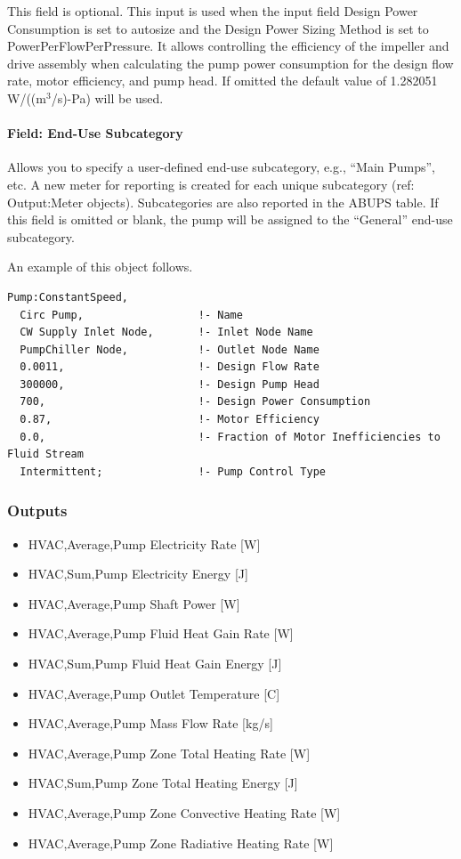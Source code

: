 This field is optional. This input is used when the input field Design Power Consumption is set to autosize and the Design Power Sizing Method is set to PowerPerFlowPerPressure. It allows controlling the efficiency of the impeller and drive assembly when calculating the pump power consumption for the design flow rate, motor efficiency, and pump head. If omitted the default value of 1.282051 W/((m\(^{3}\)/s)-Pa) will be used.

\paragraph{Field: End-Use Subcategory}\label{field-end-use-subcategory-2-000}

Allows you to specify a user-defined end-use subcategory, e.g., ``Main Pumps'', etc. A new meter for reporting is created for each unique subcategory (ref: Output:Meter objects). Subcategories are also reported in the ABUPS table. If this field is omitted or blank, the pump will be assigned to the ``General'' end-use subcategory.

An example of this object follows.

\begin{lstlisting}
Pump:ConstantSpeed,
  Circ Pump,                  !- Name
  CW Supply Inlet Node,       !- Inlet Node Name
  PumpChiller Node,           !- Outlet Node Name
  0.0011,                     !- Design Flow Rate
  300000,                     !- Design Pump Head
  700,                        !- Design Power Consumption
  0.87,                       !- Motor Efficiency
  0.0,                        !- Fraction of Motor Inefficiencies to Fluid Stream
  Intermittent;               !- Pump Control Type
\end{lstlisting}

\subsubsection{Outputs}\label{outputs-1-020}

\begin{itemize}
\item
  HVAC,Average,Pump Electricity Rate {[}W{]}
\item
  HVAC,Sum,Pump Electricity Energy {[}J{]}
\item
  HVAC,Average,Pump Shaft Power {[}W{]}
\item
  HVAC,Average,Pump Fluid Heat Gain Rate {[}W{]}
\item
  HVAC,Sum,Pump Fluid Heat Gain Energy {[}J{]}
\item
  HVAC,Average,Pump Outlet Temperature {[}C{]}
\item
  HVAC,Average,Pump Mass Flow Rate {[}kg/s{]}
\item
  HVAC,Average,Pump Zone Total Heating Rate {[}W{]}
\item
  HVAC,Sum,Pump Zone Total Heating Energy {[}J{]}
\item
  HVAC,Average,Pump Zone Convective Heating Rate {[}W{]}
\item
  HVAC,Average,Pump Zone Radiative Heating Rate {[}W{]}
\end{itemize}

